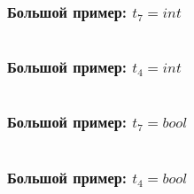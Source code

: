 \documentclass{beamer}
\begin{document}
\begin{frame}[fragile]
  \frametitle{Большой пример: $t_7 = int$}

  \begin{columns}
    \begin{column}{0.3\textwidth}
        
    \end{column}
    \begin{column}{0.7\textwidth}
      \begin{center}
        
      \end{center}
    \end{column}
    \end{columns}
\end{frame}


\begin{frame}[fragile]
  \frametitle{Большой пример: $t_4 = int$}

  \begin{columns}
    \begin{column}{0.3\textwidth}
        
    \end{column}
    \begin{column}{0.7\textwidth}
      \begin{center}
        
      \end{center}
    \end{column}
    \end{columns}
\end{frame}

\begin{frame}[fragile]
  \frametitle{Большой пример: $t_7 = bool$}

  \begin{columns}
    \begin{column}{0.3\textwidth}
        
    \end{column}
    \begin{column}{0.7\textwidth}
      \begin{center}
        
      \end{center}
    \end{column}
    \end{columns}
\end{frame}


\begin{frame}[fragile]
  \frametitle{Большой пример: $t_4 = bool$}

  \begin{columns}
    \begin{column}{0.3\textwidth}
        
    \end{column}
    \begin{column}{0.7\textwidth}
      \begin{center}
        
      \end{center}
    \end{column}
    \end{columns}
\end{frame}
\end{document}
